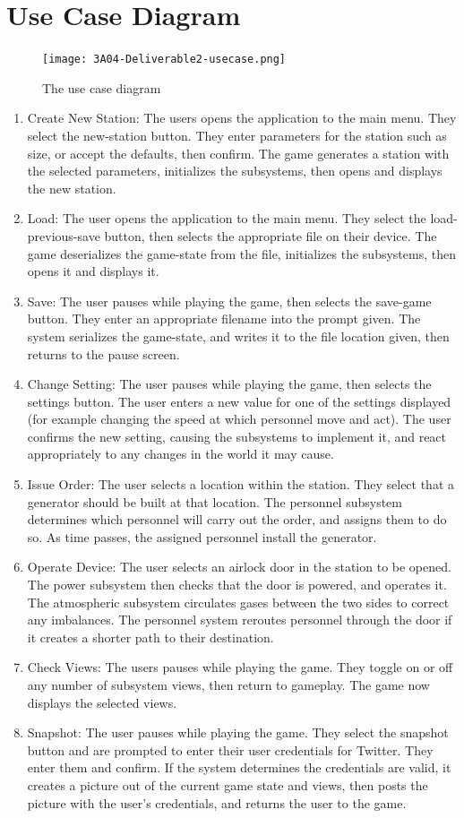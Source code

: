 \documentclass[]{article}
\begin{document}
\section{Use Case Diagram}
\label{sec:use_case_diagram}
\begin{figure}[H]
	\centering
	\texttt{[image: 3A04-Deliverable2-usecase.png]}
	\caption{The use case diagram}
\end{figure}
\begin{enumerate}
	\item Create New Station: The users opens the application to the main menu. They select the new-station button. They enter parameters for the station such as size, or accept the defaults, then confirm. The game generates a station with the selected parameters, initializes the subsystems, then opens and displays the new station.
	\item Load: The user opens the application to the main menu. They select the load-previous-save button, then selects the appropriate file on their device. The game deserializes the game-state from the file, initializes the subsystems, then opens it and displays it.
	\item Save: The user pauses while playing the game, then selects the save-game button. They enter an appropriate filename into the prompt given. The system serializes the game-state, and writes it to the file location given, then returns to the pause screen.
	\item Change Setting: The user pauses while playing the game, then selects the settings button. The user enters a new value for one of the settings displayed (for example changing the speed at which personnel move and act). The user confirms the new setting, causing the subsystems to implement it, and react appropriately to any changes in the world it may cause.
	\item Issue Order: The user selects a location within the station. They select that a generator should be built at that location. The personnel subsystem determines which personnel will carry out the order, and assigns them to do so. As time passes, the assigned personnel install the generator.
	\item Operate Device: The user selects an airlock door in the station to be opened. The power subsystem then checks that the door is powered, and operates it. The atmospheric subsystem circulates gases between the two sides to correct any imbalances. The personnel system reroutes personnel through the door if it creates a shorter path to their destination.
	\item Check Views: The users pauses while playing the game. They toggle on or off any number of subsystem views, then return to gameplay. The game now displays the selected views.
	\item Snapshot: The user pauses while playing the game. They select the snapshot button and are prompted to enter their user credentials for Twitter. They enter them and confirm. If the system determines the credentials are valid, it creates a picture out of the current game state and views, then posts the picture with the user's credentials, and returns the user to the game.
\end{enumerate}
\end{document}
